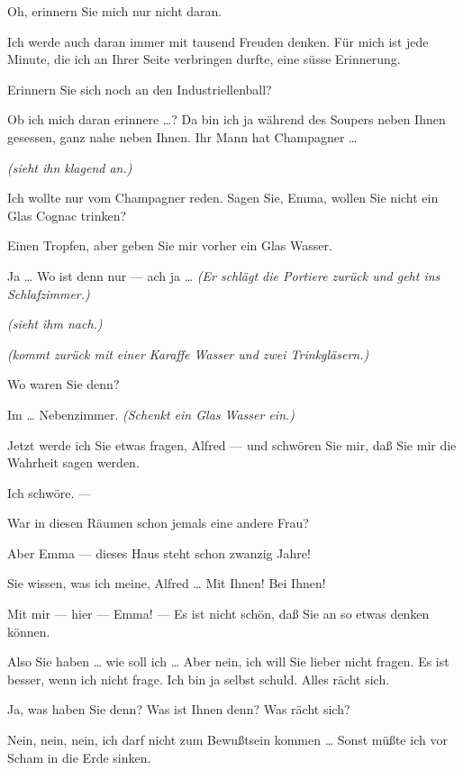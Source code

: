 \documentclass[
	final,
	a4paper,
	ngerman,
	mpinclude = true, %
	twoside = true,
	open = right,
	cleardoublepage = plain,
	DIV = 13,
	BCOR = 1cm,
	titlepage = firstiscover,
	]{scrbook}
\newcommand{\direction}[1]{\textit{(#1)}}
\newcommand{\thecharacter}[1]{\textup{\textsc{#1}}\xspace}
\newcommand{\theherr}{\thecharacter{Junger Herr}}
\newcommand{\thefrau}{\thecharacter{Junge Frau}}
\newcommand{\character}[1]{\item[#1:]}
\newcommand{\herr}{\character{\theherr}}
\newcommand{\frau}{\character{\thefrau}}
\begin{document}
\begin{play}
	\frau
	Oh, erinnern Sie mich nur nicht daran.

	\herr
	Ich werde auch daran immer mit tausend Freuden denken. Für mich ist jede Minute, die ich an Ihrer Seite verbringen durfte, eine süsse Erinnerung.

	\frau
	Erinnern Sie sich noch an den Industriellenball?

	\herr
	Ob ich mich daran erinnere \ldots{}? Da bin ich ja während des Soupers neben Ihnen gesessen, ganz nahe neben Ihnen. Ihr Mann hat Champagner \ldots{}

	\frau
	\direction{sieht ihn klagend an.}

	\herr
	Ich wollte nur vom Champagner reden. Sagen Sie, Emma, wollen Sie nicht ein Glas Cognac trinken?

	\frau
	Einen Tropfen, aber geben Sie mir vorher ein Glas Wasser.

	\herr
	Ja \ldots{} Wo ist denn nur --- ach ja \ldots{} \direction{Er schlägt die Portiere zurück und geht ins Schlafzimmer.}

	\frau
	\direction{sieht ihm nach.}

	\herr
	\direction{kommt zurück mit einer Karaffe Wasser und zwei Trinkgläsern.}

	\frau
	Wo waren Sie denn?

	\herr
	Im \ldots{} Nebenzimmer. \direction{Schenkt ein Glas Wasser ein.}

	\frau
	Jetzt werde ich Sie etwas fragen, Alfred --- und schwören Sie mir, daß Sie mir die Wahrheit sagen werden.

	\herr
	Ich schwöre. ---

	\frau
	War in diesen Räumen schon jemals eine andere Frau?

	\herr
	Aber Emma --- dieses Haus steht schon zwanzig Jahre!

	\frau
	Sie wissen, was ich meine, Alfred \ldots{} Mit Ihnen! Bei Ihnen!

	\herr
	Mit mir --- hier --- Emma! --- Es ist nicht schön, daß Sie an so etwas denken können.

	\frau
	Also Sie haben \ldots{} wie soll ich \ldots{} Aber nein, ich will Sie lieber nicht fragen. Es ist besser, wenn ich nicht frage. Ich bin ja selbst schuld. Alles rächt sich.

	\herr
	Ja, was haben Sie denn? Was ist Ihnen denn? Was rächt sich?

	\frau
	Nein, nein, nein, ich darf nicht zum Bewußtsein kommen \ldots{} Sonst müßte ich vor Scham in die Erde sinken.


\end{play}
\end{document}
